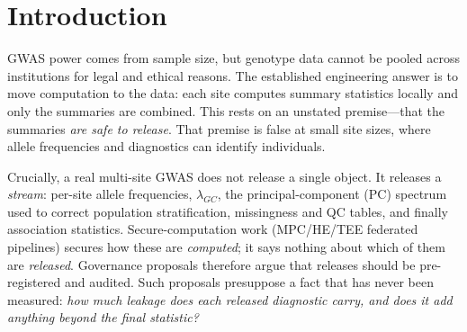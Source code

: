 \documentclass[11pt]{article}
\begin{document}
\begin{abstract}
single super-population at $n_{\text{study}}$ up to $350$).
We further build and stress-test the logic layer of the governance mechanism
itself (a pre-registered reveal manifest, an enforced egress monitor, and a
hash-chained cross-run ledger), quantify the model-dependence of the ordering
(it is approximately decreasing in measured structure under a size-controlled $F_{ST}$ sweep and
crosses at a site-size-dependent measured structure
$\approx0.03$--$0.15$),
turn the sanitized-diagnostics paradox into a controlled result with a
falsification control, and show a released raw haplotype set leaks membership
trivially while a leave-self-out longest-shared-run relatedness statistic does not
separate real unrelated members.
The implication for pre-registered reveal manifests is direct: the diagnostics
that pipelines treat as harmless are exactly the objects that must be
governed---and within our tested projection attack, withholding the study-fitted
loading matrix removes the leak while a random-basis (eigenvalue-only) release
carries none.
\end{abstract}

\section{Introduction}

GWAS power comes from sample size, but genotype data cannot be pooled across
institutions for legal and ethical reasons. The established engineering answer
is to move computation to the data: each site computes summary statistics
locally and only the summaries are combined. This rests on an unstated
premise---that the summaries \emph{are safe to release}. That premise is false
at small site sizes, where allele frequencies and diagnostics can identify
individuals.

Crucially, a real multi-site GWAS does not release a single object. It releases
a \emph{stream}: per-site allele frequencies, $\lambda_{GC}$, the
principal-component (PC) spectrum used to correct population stratification,
missingness and QC tables, and finally association statistics. Secure-computation
work (MPC/HE/TEE federated pipelines) secures how these are \emph{computed}; it
says nothing about which of them are \emph{released}. Governance proposals
therefore argue that releases should be pre-registered and audited. Such
proposals presuppose a fact that has never been measured: \emph{how much
leakage does each released diagnostic carry, and does it add anything beyond the
final statistic?}
\end{document}
